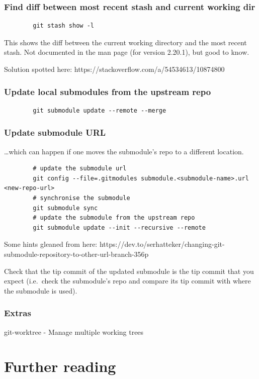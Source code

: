 \documentclass{git_course}
\begin{document}
\begin{frame}[fragile]
    \frametitle{Find diff between most recent stash and current working dir}
    \begin{verbatim}
        git stash show -l
    \end{verbatim}

    This shows the diff between the current working directory and the most
    recent stash. Not documented in the  man page (for version
    2.20.1), but good to know.

    Solution spotted here: https://stackoverflow.com/a/54534613/10874800
\end{frame}

\begin{frame}[fragile]
    \frametitle{Update local submodules from the upstream repo}

    \begin{verbatim}
        git submodule update --remote --merge
    \end{verbatim}
\end{frame}

\begin{frame}[fragile]
    \frametitle{Update submodule URL}

    \ldots which can happen if one moves the submodule's repo to a different
    location.

    \begin{verbatim}
        # update the submodule url
        git config --file=.gitmodules submodule.<submodule-name>.url <new-repo-url>
        # synchronise the submodule
        git submodule sync
        # update the submodule from the upstream repo
        git submodule update --init --recursive --remote
    \end{verbatim}

    Some hints gleaned from here:
    https://dev.to/serhatteker/changing-git-submodule-repository-to-other-url-branch-356p

    Check that the tip commit of the updated submodule is the tip commit
    that you expect (i.e.\ check the submodule's repo and compare its tip
    commit with where the submodule is used).
\end{frame}

\begin{frame}
\frametitle{Extras}
git-worktree - Manage multiple working trees
\end{frame}

\section{Further reading}
\end{document}
